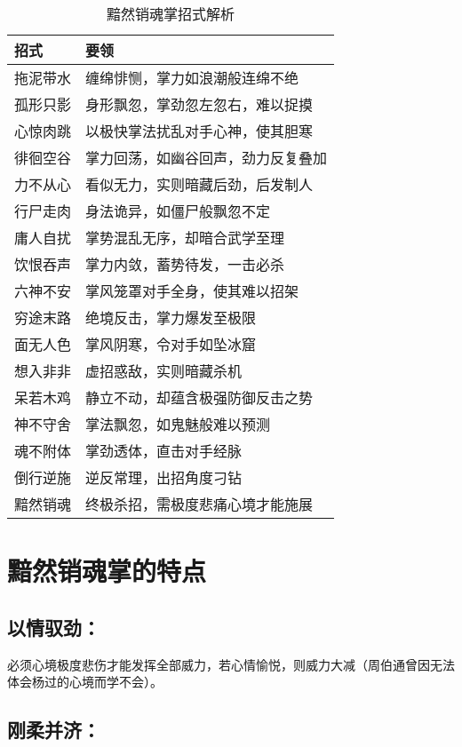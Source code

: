 \documentclass[doctor, vlined]{DissertUESTC}
\begin{document}
	\begin{table}[!h]
		\caption{黯然销魂掌招式解析}
		\begin{tabular}{l l}
			\toprule
			\textbf{招式} & \textbf{要领} \\
			\midrule
			拖泥带水 & 缠绵悱恻，掌力如浪潮般连绵不绝 \\
			孤形只影 & 身形飘忽，掌劲忽左忽右，难以捉摸 \\
			心惊肉跳 & 以极快掌法扰乱对手心神，使其胆寒 \\
			徘徊空谷 & 掌力回荡，如幽谷回声，劲力反复叠加 \\
			力不从心 & 看似无力，实则暗藏后劲，后发制人 \\
			行尸走肉 & 身法诡异，如僵尸般飘忽不定 \\
			庸人自扰 & 掌势混乱无序，却暗合武学至理 \\
			饮恨吞声 & 掌力内敛，蓄势待发，一击必杀 \\
			六神不安 & 掌风笼罩对手全身，使其难以招架 \\
			穷途末路 & 绝境反击，掌力爆发至极限 \\
			面无人色 & 掌风阴寒，令对手如坠冰窟 \\
			想入非非 & 虚招惑敌，实则暗藏杀机 \\
			呆若木鸡 & 静立不动，却蕴含极强防御反击之势 \\
			神不守舍 & 掌法飘忽，如鬼魅般难以预测 \\
			魂不附体 & 掌劲透体，直击对手经脉 \\
			倒行逆施 & 逆反常理，出招角度刁钻 \\
			黯然销魂 & 终极杀招，需极度悲痛心境才能施展 \\
			\bottomrule
		\end{tabular}
	\end{table}

	\section{黯然销魂掌的特点}

	\subsection{以情驭劲：}

	必须心境极度悲伤才能发挥全部威力，若心情愉悦，则威力大减（周伯通曾因无法体会杨过的心境而学不会）。

	\subsection{刚柔并济：}
\end{document}
